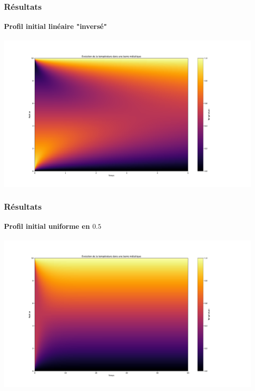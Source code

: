 \documentclass{beamer}
\begin{document}
    \begin{frame}
    \frametitle{Résultats}
    \framesubtitle{Profil initial linéaire "inversé"}

    \begin{center}
    \includegraphics[width=1.2\linewidth]{figs/Figure_5.pdf}
    \end{center}


    \end{frame}



    \begin{frame}
    \frametitle{Résultats}
    \framesubtitle{Profil initial uniforme en $0.5$}

    \begin{center}
    \includegraphics[width=1.2\linewidth]{figs/Figure_2.pdf}
    \end{center}


    \end{frame}
\end{document}
